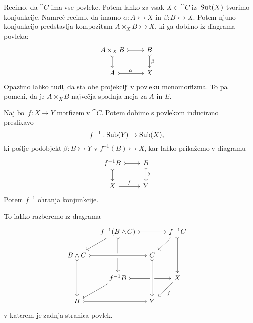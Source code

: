 \documentclass[../kategoricna_logika.tex]{subfiles}
\begin{document}
Recimo, da $\cat{C}$ ima vse povleke.  Potem lahko za vsak
$X \in \cat{C}$ iz~$\operatorname{Sub}(X)$ tvorimo konjunkcije.  Namreč recimo, da
imamo $\alpha : A \rightarrowtail X$ in
${\beta : B \rightarrowtail X}$.  Potem njuno konjunkcijo predstavlja
kompozitum $A \times_X B \rightarrowtail X$, ki ga dobimo iz diagrama
povleka:
\begin{equation*}
  \begin{tikzcd}
    A \times_X B \ar[r, tail] \ar[d, tail] & B \ar[d, tail, "\beta"] \\
    A \ar[r, tail, "\alpha"] & X
  \end{tikzcd}
\end{equation*}
Opazimo lahko tudi, da sta obe projekciji v povleku monomorfizma.  To
pa pomeni, da je $A \times_X B$ največja spodnja meja za $A$ in $B$.
\begin{lema}
Naj bo~$f : X \to Y$ morfizem v $\cat{C}$.  Potem dobimo s povlekom
inducirano preslikavo
$$f^{-1} : \operatorname{Sub}(Y) \to \operatorname{Sub}(X),$$
ki pošlje podobjekt $\beta : B \rightarrowtail Y$ v
$f^{-1}(B) \rightarrowtail X$, kar lahko prikažemo v diagramu
\begin{equation*}
  \begin{tikzcd}
    f^{-1}B \ar[r, tail] \ar[d, tail] & B \ar[d, tail, "\beta"] \\
    X \ar[r, "f"] & Y
  \end{tikzcd}
\end{equation*}
  Potem $f^{-1}$ ohranja konjunkcije.
\end{lema}
\begin{dokaz}
  To lahko razberemo iz diagrama
  \begin{equation*}
    \begin{tikzcd}[column sep=small, row sep=normal]
      & f^{-1}(B \land C) \ar[dl] \ar[dd, tail] \ar[rr, tail] & & f^{-1}C \ar[dl] \ar[dd, tail] \\
      B \land C \ar[dd, tail] \ar[rr, crossing over, tail] & & C  & \\
      & f^{-1}B \ar[dl] \ar[rr, tail] & & X \ar[dl, "f"] \\
      B \ar[rr, tail] & & Y \ar[from=uu, crossing over, tail] &
    \end{tikzcd}
  \end{equation*}
  v katerem je zadnja stranica povlek.
\end{dokaz}
\end{document}
